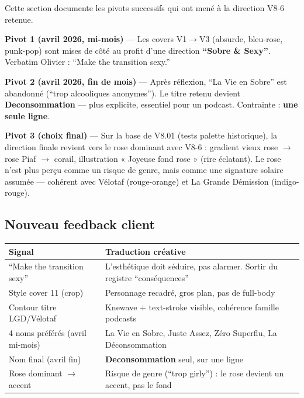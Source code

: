 \documentclass[a4paper,11pt]{article}
\newcommand{\tableheader}{\rowcolor{tableHeader}\bfseries}
\begin{document}
\begin{tcolorbox}[highlight card, title=Contexte — Historique des pivots]
Cette section documente les pivots successifs qui ont mené à la direction V8-6 retenue.

\textbf{Pivot 1 (avril 2026, mi-mois)} — Les covers V1$\rightarrow$V3 (absurde, bleu-rose, punk-pop) sont mises de côté au profit d'une direction \textbf{``Sobre \& Sexy''}. Verbatim Olivier : ``Make the transition sexy.''

\textbf{Pivot 2 (avril 2026, fin de mois)} — Après réflexion, ``La Vie en Sobre'' est abandonné (``trop alcooliques anonymes''). Le titre retenu devient \textbf{Deconsommation} — plus explicite, essentiel pour un podcast. Contrainte : \textbf{une seule ligne}.

\textbf{Pivot 3 (choix final)} — Sur la base de V8.01 (tests palette historique), la direction finale revient vers le rose dominant avec V8-6 : gradient vieux rose $\rightarrow$ rose Piaf $\rightarrow$ corail, illustration « Joyeuse fond rose » (rire éclatant). Le rose n'est plus perçu comme un risque de genre, mais comme une signature solaire assumée — cohérent avec Vélotaf (rouge-orange) et La Grande Démission (indigo-rouge).
\end{tcolorbox}

\subsection{Nouveau feedback client}

\begin{tcolorbox}[card]
\begin{tabularx}{\textwidth}{@{}lX@{}}
\toprule
\tableheader Signal & Traduction créative \\
\midrule
``Make the transition sexy'' & L'esthétique doit séduire, pas alarmer. Sortir du registre ``conséquences'' \\
Style cover 11 (crop) & Personnage recadré, gros plan, pas de full-body \\
Contour titre LGD/Vélotaf & Knewave + text-stroke visible, cohérence famille podcasts \\
4 noms préférés (avril mi-mois) & La Vie en Sobre, Juste Assez, Zéro Superflu, La Déconsommation \\
Nom final (avril fin) & \textbf{Deconsommation} seul, sur une ligne \\
Rose dominant $\rightarrow$ accent & Risque de genre (``trop girly'') : le rose devient un accent, pas le fond \\
\bottomrule
\end{tabularx}
\end{tcolorbox}
\end{document}
